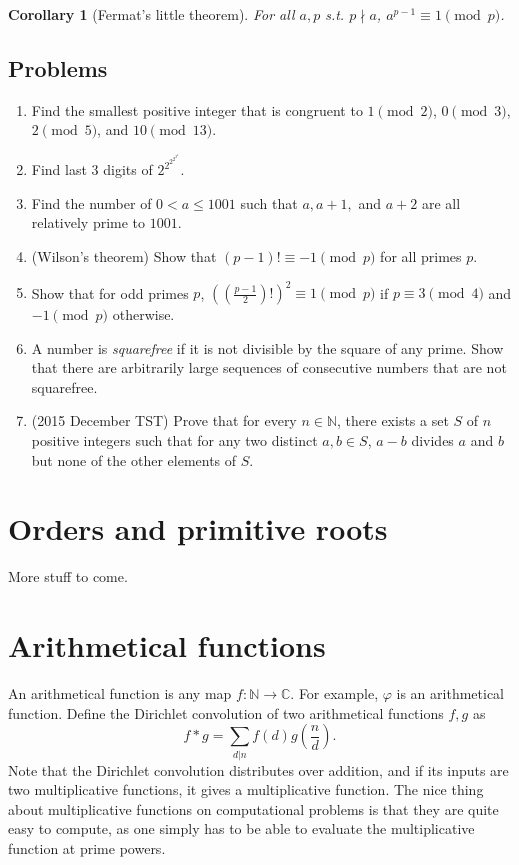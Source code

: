 \documentclass{article}
\theoremstyle{plain}
\newtheorem{corollary}{Corollary}
\numberwithin{equation}{section}
\begin{document}
\begin{corollary}[Fermat's little theorem]
For all $a, p$ s.t. $p\nmid a$, $a^{p - 1}\equiv 1\pmod{p}$.
\end{corollary}
\subsection*{Problems}

\begin{enumerate}
\item Find the smallest positive integer that is congruent to $1\pmod{2}$, $0\pmod{3}$, $2\pmod{5}$, and $10\pmod{13}$.
\item Find last 3 digits of $2^{2^{2^{2^{2^2}}}}$.
\item Find the number of $0 < a\le 1001$ such that $a, a + 1,$ and $ a + 2$ are all relatively prime to $1001$.
\item (Wilson's theorem) Show that $(p - 1)!\equiv -1\pmod{p}$ for all primes $p$.
\item Show that for odd primes $p$, $\left(\left(\frac{p - 1}{2}\right)!\right)^2\equiv 1\pmod{p}$ 
if $p\equiv 3\pmod{4}$ and $-1\pmod{p}$ otherwise.
\item A number is \textit{squarefree} if it is not divisible by the square of any prime. 
Show that there are arbitrarily large sequences of consecutive numbers that are not squarefree.
\item (2015 December TST) Prove that for every $n\in \mathbb N$, there exists a set $S$ of $n$ positive integers such that for any 
two distinct $a,b\in S$, $a-b$ divides $a$ and $b$ but none of the other elements of $S$.
\end{enumerate}

\section*{Orders and primitive roots}
More stuff to come.

\section*{Arithmetical functions}

An arithmetical function is any map $f:\mathbb N\rightarrow \mathbb{C}$. For example, $\varphi$ is an arithmetical function. 
Define the Dirichlet convolution of two arithmetical functions $f,g$ as $$f*g = \sum_{d|n} f(d)g\left(\frac{n}{d}\right).$$
Note that the Dirichlet convolution distributes over addition, and if its inputs are two multiplicative
functions, it gives a multiplicative function. The nice thing about multiplicative functions on computational problems is that
they are quite easy to compute, as one simply has to be able to evaluate the multiplicative function at prime powers. 
\end{document}
